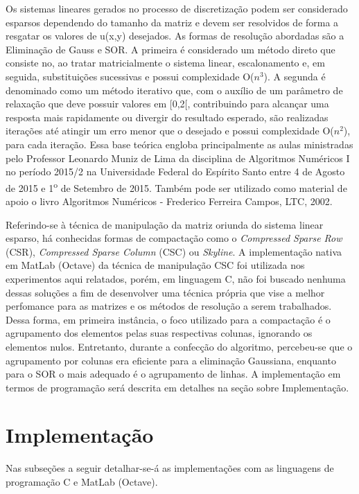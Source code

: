 \documentclass[
	article,			%
	11pt,				%
	oneside,			%
	a4paper,			%
	english,			%
	brazil,				%
	sumario=tradicional
	]{abntex2}
\begin{document}
Os sistemas lineares gerados no processo de discretização podem ser considerado esparsos dependendo do tamanho da matriz e devem ser resolvidos de forma a resgatar os valores de u(x,y) desejados. As formas de resolução abordadas são a Eliminação de Gauss e SOR. A primeira é considerado um método direto que consiste no, ao tratar matricialmente o sistema linear, escalonamento e, em seguida, substituições sucessivas e possui complexidade O($n^3$). A segunda é denominado como um método iterativo que, com o auxílio de um parâmetro de relaxação que deve possuir valores em [0,2[, contribuindo para alcançar uma resposta mais rapidamente ou divergir do resultado esperado, são realizadas iterações até atingir um erro menor que o desejado e possui complexidade O($n^2$), para cada iteração. Essa base teórica engloba principalmente as aulas ministradas pelo Professor Leonardo Muniz de Lima da disciplina de Algoritmos Numéricos I no período 2015/2 na Universidade Federal do Espírito Santo entre 4 de Agosto de 2015 e 1\textsuperscript{o} de Setembro de 2015. Também pode ser utilizado como material de apoio o livro Algoritmos Numéricos - Frederico Ferreira Campos, LTC, 2002.

Referindo-se à técnica de manipulação da matriz oriunda do sistema linear esparso, há conhecidas formas de compactação como o \emph{Compressed Sparse Row} (CSR), \emph{Compressed Sparse Column} (CSC) ou \emph{Skyline}. A implementação nativa em MatLab (Octave) da técnica de manipulação CSC foi utilizada nos experimentos aqui relatados, porém, em linguagem C, não foi buscado nenhuma dessas soluções a fim de desenvolver uma técnica própria que vise a melhor perfomance para as matrizes e os métodos de resolução a serem trabalhados. Dessa forma, em primeira instância, o foco utilizado para a compactação é o agrupamento dos elementos pelas suas respectivas colunas, ignorando os elementos nulos. Entretanto, durante a confecção do algoritmo, percebeu-se que o agrupamento por colunas era eficiente para a eliminação Gaussiana, enquanto para o SOR o mais adequado é o agrupamento de linhas. A implementação em termos de programação será descrita em detalhes na seção sobre Implementação.

\section{Implementação}

Nas subseções a seguir detalhar-se-á as implementações com as linguagens de programação C e MatLab (Octave).
\end{document}
